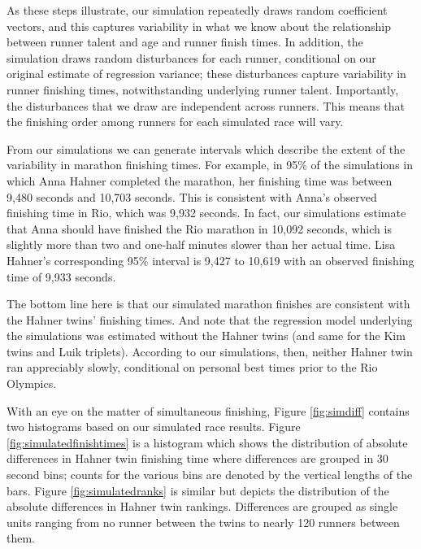 \documentclass[12pt,titlepage]{article}
\begin{document}
As these steps illustrate, our simulation repeatedly draws random
coefficient vectors, and this captures variability in what we know
about the relationship between runner talent and age and runner finish
times.  In addition, the simulation draws random disturbances for each
runner, conditional on our original estimate of regression variance;
these disturbances capture variability in runner finishing times,
notwithstanding underlying runner talent.  Importantly, the
disturbances that we draw are independent across runners.  This means
that the finishing order among runners for each simulated race will
vary.

From our simulations we can generate intervals which describe the
extent of the variability in marathon finishing times. For example, in
95\% of the simulations in which Anna Hahner completed the marathon,
her finishing time was between 9,480 seconds and 10,703 seconds. This
is consistent with Anna's observed finishing time in Rio, which was
9,932 seconds. In fact, our simulations estimate that Anna should have
finished the Rio marathon in 10,092 seconds, which is slightly more
than two and one-half minutes slower than her actual time. Lisa
Hahner's corresponding 95\% interval is 9,427 to 10,619 with an
observed finishing time of 9,933 seconds.

The bottom line here is that our simulated marathon finishes are
consistent with the Hahner twins' finishing times. And note that the
regression model underlying the simulations was estimated without the
Hahner twins (and same for the Kim twins and Luik triplets). According
to our simulations, then, neither Hahner twin ran appreciably slowly,
conditional on personal best times prior to the Rio Olympics.



With an eye on the matter of simultaneous finishing, Figure
\ref{fig:simdiff} contains two histograms based on our simulated race
results. Figure \ref{fig:simulatedfinishtimes} is a histogram which
shows the distribution of absolute differences in Hahner twin
finishing time where differences are grouped in 30 second bins; counts
for the various bins are denoted by the vertical lengths of the bars.
Figure \ref{fig:simulatedranks} is similar but depicts the
distribution of the absolute differences in Hahner twin rankings.
Differences are grouped as single units ranging from no runner between
the twins to nearly 120 runners between them.
\end{document}
